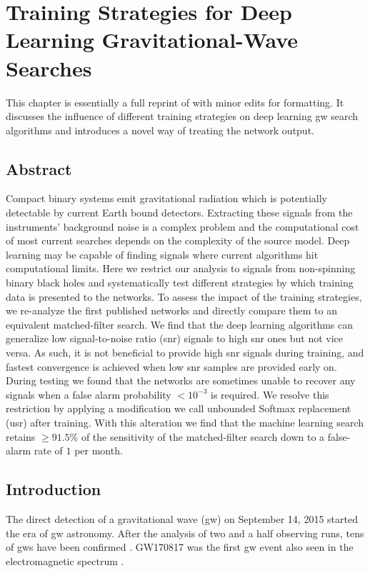 \chapter{Training Strategies for Deep Learning Gravitational-Wave Searches}\label{ch:training_strats}
\minitoc
This chapter is essentially a full reprint of \cite{Schafer:2021fea} with minor edits for formatting. It discusses the influence of different training strategies on deep learning \acrshort{gw} search algorithms and introduces a novel way of treating the network output. 

\setcounter{section}{-1}
\section{Abstract}
Compact binary systems emit gravitational radiation which is potentially detectable by current Earth bound detectors. Extracting these signals from the instruments' background noise is a complex problem and the computational cost of most current searches depends on the complexity of the source model. Deep learning may be capable of finding signals where current algorithms hit computational limits. Here we restrict our analysis to signals from non-spinning binary black holes and systematically test different strategies by which training data is presented to the networks. To assess the impact of the training strategies, we re-analyze the first published networks and directly compare them to an equivalent matched-filter search. We find that the deep learning algorithms can generalize low signal-to-noise ratio (\acrshort{snr}) signals to high \acrshort{snr} ones but not vice versa. As such, it is not beneficial to provide high \acrshort{snr} signals during training, and fastest convergence is achieved when low \acrshort{snr} samples are provided early on. During testing we found that the networks are sometimes unable to recover any signals when a false alarm probability $<10^{-3}$ is required. We resolve this restriction by applying a modification we call unbounded Softmax replacement (\acrshort{usr}) after training. With this alteration we find that the machine learning search retains $\geq 91.5\%$ of the sensitivity of the matched-filter search down to a false-alarm rate of $1$ per month.

\section{Introduction}
The direct detection of a gravitational wave (\acrshort{gw}) on September 14, 2015 \cite{LIGOScientific:2016aoc} started the era of \acrshort{gw} astronomy. After the analysis of two and a half observing runs, tens of \acrshort{gw}s have been confirmed \cite{LIGOScientific:2020ibl, Nitz:2021uxj}. GW170817 \cite{LIGOScientific:2017vwq} was the first \acrshort{gw} event also seen in the electromagnetic spectrum \cite{Goldstein:2017mmi, Savchenko:2017ffs, DES:2017kbs, LIGOScientific:2017ync}.

